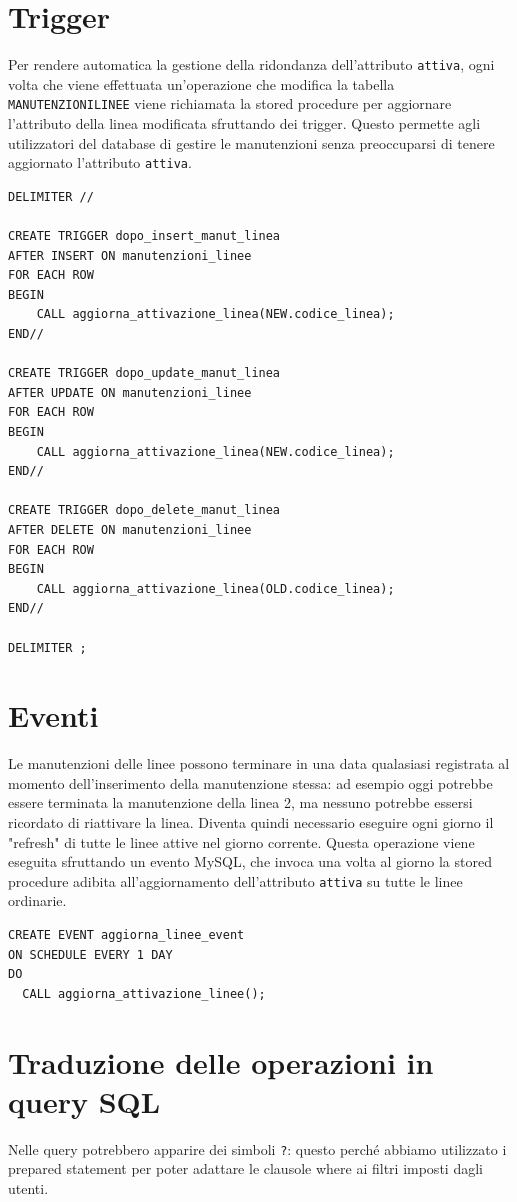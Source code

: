 \documentclass[12pt,a4paper]{report}
\begin{document}
\section{Trigger}
Per rendere automatica la gestione della ridondanza dell'attributo \texttt{attiva}, ogni volta che viene effettuata un'operazione che modifica la tabella \texttt{MANUTENZIONI{\textunderscore}LINEE} viene richiamata la stored procedure per aggiornare l'attributo della linea modificata sfruttando dei trigger. Questo permette agli utilizzatori del database di gestire le manutenzioni senza preoccuparsi di tenere aggiornato l'attributo \texttt{attiva}. \\
\begin{lstlisting}[style=sqlstyle]
DELIMITER //

CREATE TRIGGER dopo_insert_manut_linea
AFTER INSERT ON manutenzioni_linee
FOR EACH ROW
BEGIN
    CALL aggiorna_attivazione_linea(NEW.codice_linea);
END//

CREATE TRIGGER dopo_update_manut_linea
AFTER UPDATE ON manutenzioni_linee
FOR EACH ROW
BEGIN
    CALL aggiorna_attivazione_linea(NEW.codice_linea);
END//

CREATE TRIGGER dopo_delete_manut_linea
AFTER DELETE ON manutenzioni_linee
FOR EACH ROW
BEGIN
    CALL aggiorna_attivazione_linea(OLD.codice_linea);
END//

DELIMITER ;
\end{lstlisting}

\section{Eventi}
Le manutenzioni delle linee possono terminare in una data qualasiasi registrata al momento dell'inserimento della manutenzione stessa: ad esempio oggi potrebbe essere terminata la manutenzione della linea 2, ma nessuno potrebbe essersi ricordato di riattivare la linea. Diventa quindi necessario eseguire ogni giorno il "refresh" di tutte le linee attive nel giorno corrente. Questa operazione viene eseguita sfruttando un evento MySQL, che invoca una volta al giorno la stored procedure adibita all'aggiornamento dell'attributo \texttt{attiva} su tutte le linee ordinarie. \\
\begin{lstlisting}[style=sqlstyle]
CREATE EVENT aggiorna_linee_event
ON SCHEDULE EVERY 1 DAY
DO
  CALL aggiorna_attivazione_linee();
\end{lstlisting}

\section{Traduzione delle operazioni in query SQL}
Nelle query potrebbero apparire dei simboli \texttt{?}: questo perché abbiamo utilizzato i prepared statement per poter adattare le clausole where ai filtri imposti dagli utenti.
\end{document}
